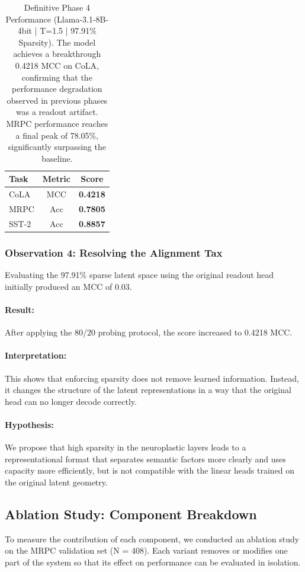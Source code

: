 \documentclass[11pt, letterpaper]{article}
\begin{document}
\begin{table}[h!]
    \centering
    \caption{Definitive Phase 4 Performance (Llama-3.1-8B-4bit | T=1.5 | 97.91\% 
Sparsity). The model achieves a breakthrough 0.4218 MCC on CoLA, confirming that the performance degradation observed in previous phases was a readout 
artifact. MRPC performance reaches a final peak of 78.05\%, significantly surpassing the baseline.}
    \label{tab:phase4_final}
    \begin{tabular}{l|c|c}
    \toprule
    \textbf{Task} & \textbf{Metric} & \textbf{Score} 
\\ 
    \midrule
    CoLA & MCC & \textbf{0.4218} \\
    MRPC & Acc & \textbf{0.7805} \\
    SST-2 & Acc & \textbf{0.8857} \\
    \bottomrule
    \end{tabular}
\end{table}

\subsubsection{Observation 4: Resolving the Alignment Tax}
Evaluating the 97.91\% sparse latent space using the original readout head initially produced an MCC of 0.03.
\paragraph{Result:} After applying the 80/20 probing protocol, the score increased to 0.4218 MCC.
\paragraph{Interpretation:} This shows that enforcing sparsity does not remove learned information. Instead, it changes the structure of the latent representations in a way that the original head can no longer decode correctly.
\paragraph{Hypothesis:} We propose that high sparsity in the neuroplastic layers leads to a representational format that separates semantic factors more clearly and uses capacity more efficiently, but is not compatible with the linear heads trained on the original latent geometry.

\subsection{Ablation Study: Component Breakdown}
To measure the contribution of each component, we conducted an ablation study on the MRPC validation set (N = 408). Each variant removes or modifies one part of the system so that its effect on performance can be evaluated in isolation.
\end{document}
